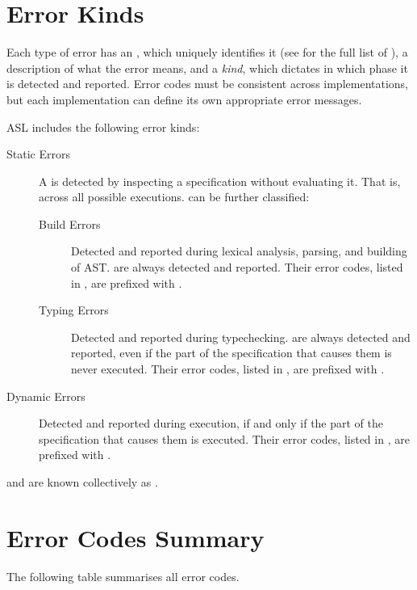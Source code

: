 \section{Error Kinds}
\hypertarget{def-errorcodeterm}{}
Each type of error has an \emph{\errorcodeterm}, which uniquely identifies it
(see  for the full list of \errorcodesterm),
a description of what the error means,
and a \emph{kind}, which dictates in which phase it is detected and reported.
Error codes must be consistent across implementations, but each implementation
can define its own appropriate error messages.

ASL includes the following error kinds:
\begin{description}
  \item[Static Errors] \hypertarget{def-staticerrorterm}{}
  A \emph{\staticerrorterm} is detected by inspecting a specification without evaluating it.
  That is, across all possible executions. \staticerrorsterm{} can be further classified:
  \begin{description}
    \item[Build Errors] \hypertarget{def-builderrorterm}{}
      Detected and reported during lexical analysis, parsing, and building of AST.
      \Builderrorsterm{} are always detected and reported.
      Their error codes, listed in , are prefixed with \BuildErrorPrefix.

    \item[Typing Errors] \hypertarget{def-typingerrorterm}{}
      Detected and reported during typechecking.
      \Typingerrorsterm{} are always detected and reported, even if the part of the specification that causes them is never executed.
      Their error codes, listed in , are prefixed with \TypeErrorPrefix.
  \end{description}

  \item[Dynamic Errors] \hypertarget{def-dynamicerrorterm}{}
    Detected and reported during execution, if and only if the part of the specification that causes them is executed.
    Their error codes, listed in , are prefixed with \DynamicErrorPrefix.
\end{description}

\Builderrorsterm{} and \typingerrorsterm{} are known collectively as .

\section{Error Codes Summary\label{sec:ErrorCodesSummary}}
The following table summarises all error codes.

